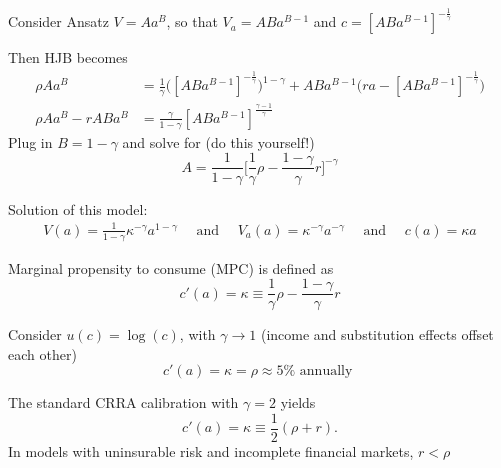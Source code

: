 \documentclass[11pt, aspectratio=169]{beamer}
\newenvironment{witemize}{\itemize\addtolength{\itemsep}{10pt}}{\enditemize}
\begin{document}
\begin{frame}{}
\begin{witemize}
\item Consider Ansatz $V = Aa^B$, so that $V_a = AB a^{B-1}$ and $c = [AB a^{B-1}]^{- \frac{1}{\gamma}}$

\item Then HJB becomes
\begin{align*}
	\rho A a^B &= \frac{1}{\gamma} \bigg( [AB a^{B-1}]^{- \frac{1}{\gamma}} \bigg)^{1-\gamma} + AB a^{B-1} \bigg( r a - [AB a^{B-1}]^{- \frac{1}{\gamma}} \bigg) \\
	\rho A a^B - r A B a^B &= \frac{\gamma}{1-\gamma} [A B a^{B-1}]^\frac{\gamma-1}{\gamma}
\end{align*}
Plug in $B = 1-\gamma$ and solve for (do this yourself!)
\begin{equation*}
	A = \frac{1}{1-\gamma} \bigg[ \frac{1}{\gamma} \rho - \frac{1-\gamma}{\gamma} r \bigg]^{-\gamma}
\end{equation*}

\item Solution of this model:
\begin{align*}
	V(a) = \frac{1}{1-\gamma} \kappa^{-\gamma} a^{1-\gamma}
	\quad \text{ and } \quad
	V_a(a) = \kappa^{-\gamma} a^{-\gamma} 
	\quad \text{ and } \quad
	c(a) = \kappa a
\end{align*}
\end{witemize}
\end{frame}


\begin{frame}{}
\begin{witemize}
\item Marginal propensity to consume (MPC) is defined as
\begin{equation*}
	c'(a) = \kappa \equiv \frac{1}{\gamma} \rho - \frac{1-\gamma}{\gamma} r
\end{equation*}

\item Consider $u(c) = \log(c)$, with $\gamma \to 1$ (income and substitution effects offset each other)
\begin{equation*}
	c'(a) = \kappa = \rho \approx 5 \% \text{ annually }
\end{equation*}

\item The standard CRRA calibration with $\gamma = 2$ yields
\begin{equation*}
	c'(a) = \kappa \equiv \frac{1}{2} (\rho + r).
\end{equation*}
In models with uninsurable risk and incomplete financial markets, $r < \rho$

\end{witemize}
\end{frame}
\end{document}
